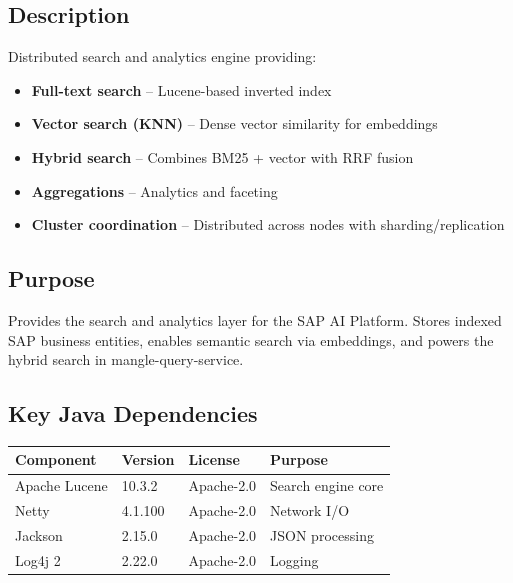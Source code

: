 \documentclass[11pt,a4paper]{article}
\begin{document}
\subsection{Description}

Distributed search and analytics engine providing:

\begin{itemize}[noitemsep]
    \item \textbf{Full-text search} -- Lucene-based inverted index
    \item \textbf{Vector search (KNN)} -- Dense vector similarity for embeddings
    \item \textbf{Hybrid search} -- Combines BM25 + vector with RRF fusion
    \item \textbf{Aggregations} -- Analytics and faceting
    \item \textbf{Cluster coordination} -- Distributed across nodes with sharding/replication
\end{itemize}

\subsection{Purpose}

Provides the search and analytics layer for the SAP AI Platform. Stores indexed SAP business entities, enables semantic search via embeddings, and powers the hybrid search in mangle-query-service.

\subsection{Key Java Dependencies}

\begin{longtable}{@{}L{3.5cm}L{2cm}L{2.5cm}L{5cm}@{}}
\toprule
\textbf{Component} & \textbf{Version} & \textbf{License} & \textbf{Purpose} \\
\midrule
\endhead
Apache Lucene & 10.3.2 & Apache-2.0 & Search engine core \\
Netty & 4.1.100 & Apache-2.0 & Network I/O \\
Jackson & 2.15.0 & Apache-2.0 & JSON processing \\
Log4j 2 & 2.22.0 & Apache-2.0 & Logging \\
\bottomrule
\end{longtable}

\newpage

\end{document}
